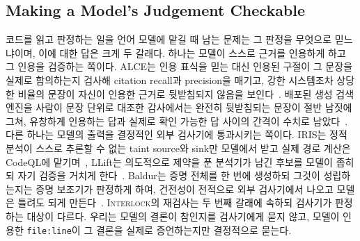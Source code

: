 \documentclass[acmsmall,screen,review,anonymous]{acmart}
\begin{document}
\subsection{Making a Model's Judgement Checkable}
\label{sec:related:verifiable}

코드를 읽고 판정하는 일을 언어 모델에 맡길 때 남는 문제는 그 판정을 무엇으로 믿느냐이며, 이에 대한 답은 크게 두 갈래다. 하나는 모델이 스스로 근거를 인용하게 하고 그 인용을 검증하는 쪽이다. ALCE는 인용 표식을 믿는 대신 인용된 구절이 그 문장을 실제로 함의하는지 검사해 citation recall과 precision을 매기고, 강한 시스템조차 상당한 비율의 문장이 자신이 인용한 근거로 뒷받침되지 않음을 보인다~\cite{gao2023enabling}. 배포된 생성 검색 엔진을 사람이 문장 단위로 대조한 감사에서는 완전히 뒷받침되는 문장이 절반 남짓에 그쳐, 유창하게 인용하는 답과 실제로 확인 가능한 답 사이의 간격이 수치로 남았다~\cite{liu2023evaluating}. 다른 하나는 모델의 출력을 결정적인 외부 검사기에 통과시키는 쪽이다. IRIS는 정적 분석이 스스로 추론할 수 없는 taint source와 sink만 모델에서 받고 실제 경로 계산은 CodeQL에 맡기며~\cite{li2025iris}, LLift는 의도적으로 제약을 푼 분석기가 남긴 후보를 모델이 좁히되 자기 검증을 거치게 한다~\cite{li2024llift}. Baldur는 증명 전체를 한 번에 생성하되 그것이 성립하는지는 증명 보조기가 판정하게 하여, 건전성이 전적으로 외부 검사기에서 나오고 모델은 틀려도 되게 만든다~\cite{first2023baldur}. \textsc{Interlock}의 재검사는 두 번째 갈래에 속하되 검사기가 판정하는 대상이 다르다. 우리는 모델의 결론이 참인지를 검사기에게 묻지 않고, 모델이 인용한 \texttt{file:line}이 그 결론을 실제로 증언하는지만 결정적으로 묻는다.
\end{document}
